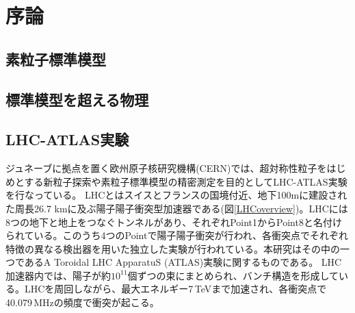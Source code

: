 \chapter{序論}
\label{chap_intro}




\section{素粒子標準模型}
\label{sec_intro_sm}

\section{標準模型を超える物理}
\label{sec_intro_bsm}

\section{LHC-ATLAS実験}
\label{sec_intro_atlas}

ジュネーブに拠点を置く欧州原子核研究機構(CERN)では、超対称性粒子をはじめとする新粒子探索や素粒子標準模型の精密測定を目的としてLHC-ATLAS実験を行なっている。
LHCとはスイスとフランスの国境付近、地下100mに建設された周長26.7 kmに及ぶ陽子陽子衝突型加速器である(図\ref{LHCoverview})。LHCには8つの地下と地上をつなぐトンネルがあり、それぞれPoint1からPoint8と名付けられている。このうち4つのPointで陽子陽子衝突が行われ、各衝突点でそれぞれ特徴の異なる検出器を用いた独立した実験が行われている。本研究はその中の一つであるA Toroidal LHC ApparatuS (ATLAS)実験に関するものである。
LHC加速器内では、陽子が約$10^{11}$個ずつの束にまとめられ、バンチ構造を形成している。LHCを周回しながら、最大エネルギー7\,TeVまで加速され、各衝突点で40.079\,MHzの頻度で衝突が起こる。

